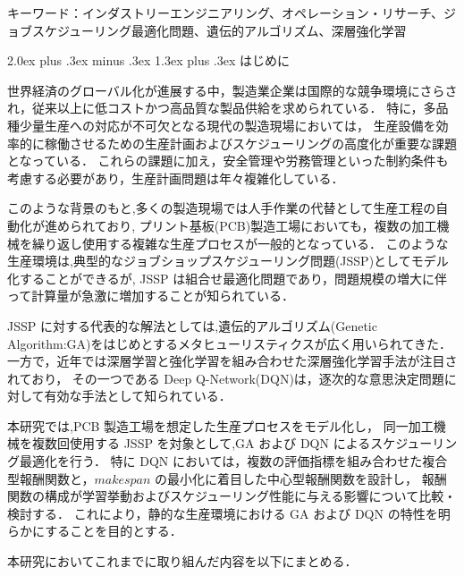 \documentclass{jarticle}
\makeatletter
\renewcommand{\section}{%
  \@startsection{section}{1}{\z@}%
  {2.0ex plus .3ex minus .3ex}%
  {1.3ex plus .3ex}%
  {\huge\bfseries}%
}
\makeatother
\begin{document}
キーワード：インダストリーエンジニアリング、オペレーション・リサーチ、ジョブスケジューリング最適化問題、遺伝的アルゴリズム、深層強化学習

\clearpage

\tableofcontents
\clearpage

\section{はじめに}

世界経済のグローバル化が進展する中，製造業企業は国際的な競争環境にさらされ，従来以上に低コストかつ高品質な製品供給を求められている．
特に，多品種少量生産への対応が不可欠となる現代の製造現場においては，
生産設備を効率的に稼働させるための生産計画およびスケジューリングの高度化が重要な課題となっている．
これらの課題に加え，安全管理や労務管理といった制約条件も考慮する必要があり，生産計画問題は年々複雑化している．

このような背景のもと,多くの製造現場では人手作業の代替として生産工程の自動化が進められており,
プリント基板(PCB)製造工場においても，複数の加工機械を繰り返し使用する複雑な生産プロセスが一般的となっている．
このような生産環境は,典型的なジョブショップスケジューリング問題(JSSP)としてモデル化することができるが,
JSSP は組合せ最適化問題であり，問題規模の増大に伴って計算量が急激に増加することが知られている．

JSSP に対する代表的な解法としては,遺伝的アルゴリズム(Genetic Algorithm:GA)をはじめとするメタヒューリスティクスが広く用いられてきた．
一方で，近年では深層学習と強化学習を組み合わせた深層強化学習手法が注目されており，
その一つである Deep Q-Network(DQN)は，逐次的な意思決定問題に対して有効な手法として知られている．

本研究では,PCB 製造工場を想定した生産プロセスをモデル化し，
同一加工機械を複数回使用する JSSP を対象として,GA および DQN によるスケジューリング最適化を行う．
特に DQN においては，複数の評価指標を組み合わせた複合型報酬関数と，$makespan$ の最小化に着目した中心型報酬関数を設計し，
報酬関数の構成が学習挙動およびスケジューリング性能に与える影響について比較・検討する．
これにより，静的な生産環境における GA および DQN の特性を明らかにすることを目的とする．

本研究においてこれまでに取り組んだ内容を以下にまとめる．
\end{document}
